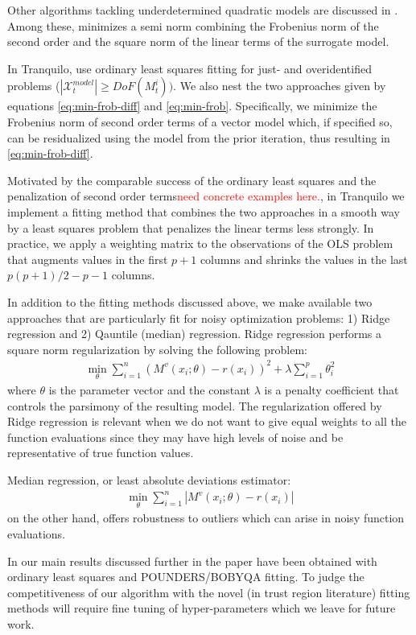 Other algorithms tackling underdetermined quadratic models are discussed in \cite{Larson2019}. Among these, \cite{Powell2012} minimizes a semi norm combining the Frobenius norm of the second order and the square norm of the linear terms of the surrogate model.

In Tranquilo, use ordinary least squares fitting for just- and overidentified problems ($|\mathcal{X}_t^{model}|\geq DoF(M_t^{i}))$. We also nest the two approaches given by equations \ref{eq:min-frob-diff} and \ref{eq:min-frob}. Specifically, we minimize the Frobenius norm of second order terms of a vector model which, if specified so, can be residualized using the model from the prior iteration, thus resulting in \ref{eq:min-frob-diff}.

Motivated by the comparable success of the ordinary least squares and the penalization of second order terms\textcolor{red}{need concrete examples here.}, in Tranquilo we implement a fitting method that combines the two approaches in a smooth way by a least squares problem that penalizes the linear terms less strongly. In practice, we apply a weighting matrix to the observations of the OLS problem that augments values in the first $p+1$ columns and shrinks the values in the last $p(p+1)/2-p-1$ columns.

In addition to the fitting methods discussed above, we make available two approaches that are particularly fit for noisy optimization problems: 1) Ridge regression and 2) Qauntile (median) regression. Ridge regression performs a square norm regularization by solving the following problem:
\begin{align}
    \min\limits_{\theta}\sum\limits_{i=1}^{n}(M^v(x_i;\theta)-r(x_i))^2+\lambda\sum\limits_{i=1}^{p}\theta_i^2
    \label{eq:fit-ridge}
\end{align}
where $\theta$ is the parameter vector and the constant $\lambda$ is a penalty coefficient that controls the parsimony of the resulting model. The regularization offered by Ridge regression is relevant when we do not want to give equal weights to all the function evaluations since they may have high levels of noise and be representative of true function values.

Median regression, or least absolute deviations estimator:
\begin{align}
    \min\limits_{\theta}\sum\limits_{i=1}^{n}|M^v(x_i;\theta)-r(x_i)|
    \label{eq:fit-lad}
\end{align}
on the other hand, offers robustness to outliers which can arise in noisy function evaluations.

In our main results discussed further in the paper have been obtained with ordinary least squares and POUNDERS/BOBYQA fitting. To judge the competitiveness of our algorithm with the novel (in trust region literature) fitting methods will require fine tuning of hyper-parameters which we leave for future work.
